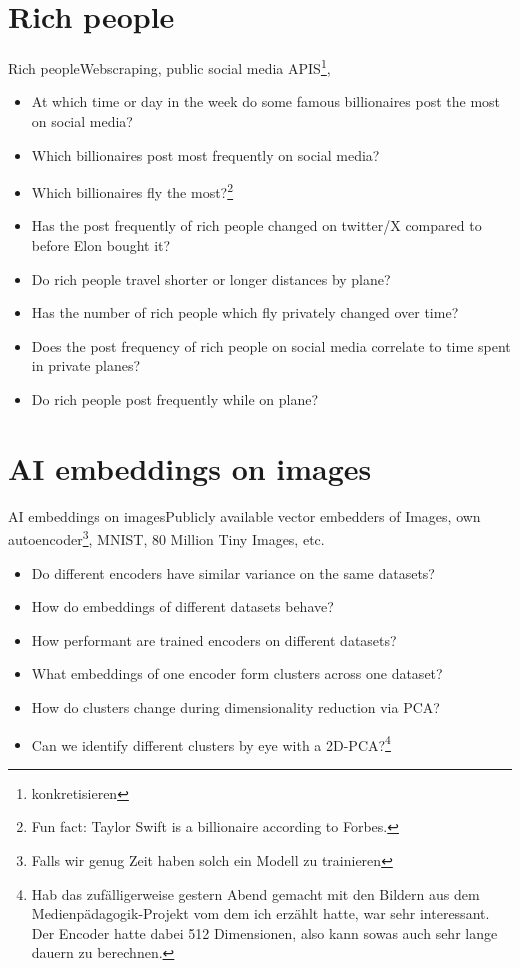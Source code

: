     \section{Rich people}
    \begin{frame}{Rich people}{Webscraping, public social media APIS\footnote{konkretisieren}, }
        \begin{itemize}[<+->]
            \item At which time or day in the week do some famous billionaires post the most on social media?
            \item Which billionaires post most frequently on social media?
            \item Which billionaires fly the most?\footnote{Fun fact: Taylor Swift is a billionaire according to Forbes.}
            \item Has the post frequently of rich people changed on twitter/X compared to before Elon bought it?
            \item Do rich people travel shorter or longer distances by plane?
            \item Has the number of rich people which fly privately changed over time?
            \item Does the post frequency of rich people on social media correlate to time spent in private planes?
            \item Do rich people post frequently while on plane?
        \end{itemize}
    \end{frame}

    \section{AI embeddings on images}
    \begin{frame}{AI embeddings on images}{Publicly available vector embedders of Images, own autoencoder\footnote{Falls wir genug Zeit haben solch ein Modell zu trainieren}, MNIST, 80 Million Tiny Images, etc.}
        \begin{itemize}[<+->]
            \item Do different encoders have similar variance on the same datasets?
            \item How do embeddings of different datasets behave?
            \item How performant are trained encoders on different datasets?
            \item What embeddings of one encoder form clusters across one dataset?
            \item How do clusters change during dimensionality reduction via PCA?
            \item Can we identify different clusters by eye with a 2D-PCA?\footnote{Hab das zufälligerweise gestern Abend gemacht mit den Bildern aus dem Medienpädagogik-Projekt vom dem ich erzählt hatte, war sehr interessant. Der Encoder hatte dabei 512 Dimensionen, also kann sowas auch sehr lange dauern zu berechnen.}
        \end{itemize}
    \end{frame}

